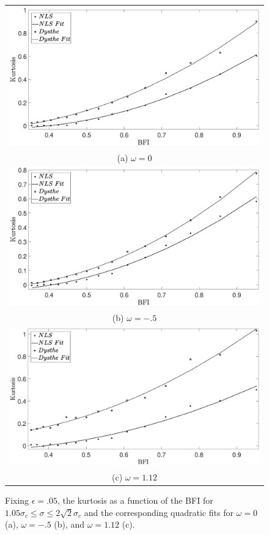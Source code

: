 \documentclass[a4paper,11pt]{article}
\begin{document}
\begin{figure}[!ht]
\centering
\begin{tabular}{c}
\includegraphics[width=.8\textwidth]{kurtosis_fit_om_0_Nens_128}\\
(a) $\omega = 0$ \\
\includegraphics[width=.8\textwidth]{kurtosis_fit_om_nh_Nens_128}\\
(b) $\omega = -.5$\\
\includegraphics[width=.8\textwidth]{kurtosis_fit_om_1pt12_Nens_128} \\
(c) $\omega=1.12$  
\end{tabular}
\caption{Fixing $\epsilon=.05$, the kurtosis as a function of the BFI for $1.05\sigma_{c}\leq \sigma\leq 2\sqrt{2}\sigma_{c}$ and the corresponding quadratic fits for $\omega=0$ (a), $\omega=-.5$ (b), and $\omega=1.12$ (c).}
\label{fig:kurtplt}
\end{figure}
\end{document}

